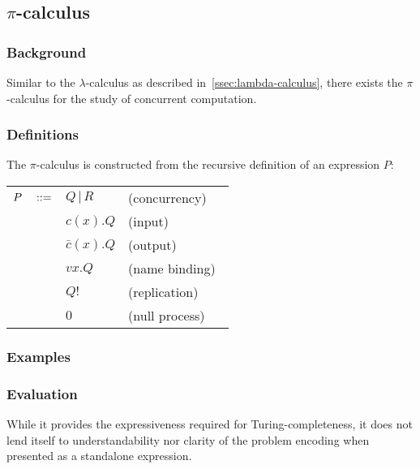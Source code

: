 \subsection{\texorpdfstring{$\pi$-}{Pi }calculus}\label{subsec:pi-calculus}

    \subsubsection{Background}
        \cite{pi-calculus}
        Similar to the $\lambda$-calculus as described in~\ref{ssec:lambda-calculus}, there exists the $\pi$-calculus for the study of concurrent computation.


    \subsubsection{Definitions}
        The $\pi$-calculus is constructed from the recursive definition of an expression $P$:
        \begin{center} %
            \begin{tabular}{ l l l }
                $P \quad ::=$    & $Q \, | \, R$     & (concurrency) \\
                                    & $ c(x).Q$         & (input) \\
                                    & $\bar{c}(x).Q$    & (output) \\
                                    & $vx.Q$            & (name binding)~\footnotemark\\
                                    & $Q!$              & (replication)~\footnotemark\\
                                    & $0$               & (null process) \\
            \end{tabular}
        \end{center}
        \addtocounter{footnote}{-1}

    \subsubsection{Examples}


    \subsubsection{Evaluation}
        While it provides the expressiveness required for Turing-completeness, it does not lend itself to understandability nor clarity of the problem encoding when presented as a standalone expression.

